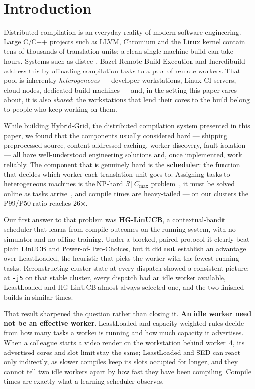 \documentclass[final,5p,times,twocolumn]{elsarticle}
\begin{document}
\section{Introduction}
\label{sec:intro}

Distributed compilation is an everyday reality of modern software engineering. Large C/C++ projects such as LLVM, Chromium and the Linux kernel contain tens of thousands of translation units; a clean single-machine build can take hours. Systems such as distcc~\cite{distcc}, Bazel Remote Build Execution and Incredibuild address this by offloading compilation tasks to a pool of remote workers. That pool is inherently \emph{heterogeneous} --- developer workstations, Linux CI servers, cloud nodes, dedicated build machines --- and, in the setting this paper cares about, it is also \emph{shared}: the workstations that lend their cores to the build belong to people who keep working on them.

While building Hybrid-Grid, the distributed compilation system presented in this paper, we found that the components usually considered hard --- shipping preprocessed source, content-addressed caching, worker discovery, fault isolation --- all have well-understood engineering solutions and, once implemented, work reliably. The component that is genuinely hard is the \textbf{scheduler}: the function that decides which worker each translation unit goes to. Assigning tasks to heterogeneous machines is the NP-hard $R||C_{\max}$ problem~\cite{lenstra1990}, it must be solved online as tasks arrive~\cite{graham1969}, and compile times are heavy-tailed --- on our clusters the P99/P50 ratio reaches 26$\times$.

Our first answer to that problem was \textbf{HG-LinUCB}, a contextual-bandit scheduler that learns from compile outcomes on the running system, with no simulator and no offline training. Under a blocked, paired protocol it clearly beat plain LinUCB and Power-of-Two-Choices, but it did \textbf{not} establish an advantage over LeastLoaded, the heuristic that picks the worker with the fewest running tasks. Reconstructing cluster state at every dispatch showed a consistent picture: at \texttt{-j5} on that stable cluster, every dispatch had an idle worker available, LeastLoaded and HG-LinUCB almost always selected one, and the two finished builds in similar times.

That result sharpened the question rather than closing it. \textbf{An idle worker need not be an effective worker.} LeastLoaded and capacity-weighted rules decide from how many tasks a worker is running and how much capacity it advertises. When a colleague starts a video render on the workstation behind worker~4, its advertised cores and slot limit stay the same; LeastLoaded and SED can react only indirectly, as slower compiles keep its slots occupied for longer, and they cannot tell two idle workers apart by how fast they have been compiling. Compile times are exactly what a learning scheduler observes.
\end{document}
